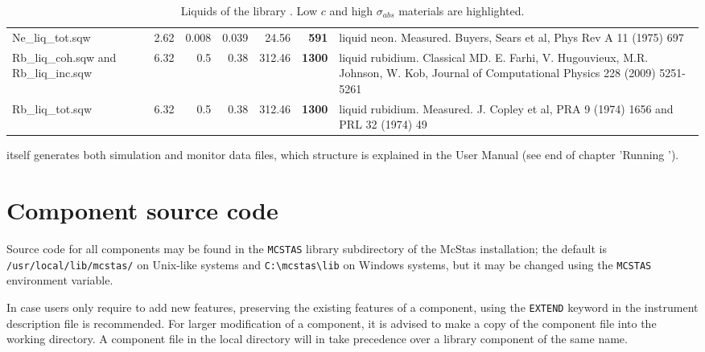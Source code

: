 \begin{table}
\begin{center}
{\begin{small}
\begin{tabular}{|l|rrr|rr|p{}|}
Ne\_liq\_tot.sqw                      & 2.62      & 0.008    &0.039     &24.56     &{\bf 591}   & liquid neon. Measured. Buyers, Sears et al, Phys Rev A 11 (1975) 697\\
Rb\_liq\_coh.sqw and Rb\_liq\_inc.sqw & 6.32      & 0.5      &0.38      &312.46    &{\bf 1300}  & liquid rubidium. Classical MD. E. Farhi, V. Hugouvieux, M.R. Johnson, W. Kob, Journal of Computational Physics 228 (2009) 5251-5261 \\
Rb\_liq\_tot.sqw                      & 6.32      & 0.5      &0.38      &312.46    &{\bf 1300}  & liquid rubidium. Measured. J. Copley et al, PRA 9 (1974) 1656 and PRL 32 (1974) 49 \\
      \hline
    \end{tabular}\end{small}
    \caption{Liquids of the \MCS library \cite{icsd_ill,ILLblue}. Low $c$ and high $\sigma_{abs}$ materials are highlighted.}
    \label{t:liquids-data}
    }
  \end{center}
\end{table}

\MCS itself generates both simulation and monitor data files, which structure is explained in the User Manual (see end of chapter 'Running \MCS ').

\section{Component source code}
Source code for all components may be found in the \verb+MCSTAS+ library
subdirectory of the McStas installation;
the default is \verb+/usr/local/lib/mcstas/+
on Unix-like systems and \verb+C:\mcstas\lib+ on Windows systems, but it may be
changed using the \verb+MCSTAS+ environment variable.

In case users only require to add new features, preserving the existing features of a component,
using the \verb+EXTEND+ keyword in the instrument description file is recommended. For larger modification of a component, it is advised to make a copy
of the component file into the working directory.
A component file in the local directory will in \MCS take precedence over
a library component of the same name.

